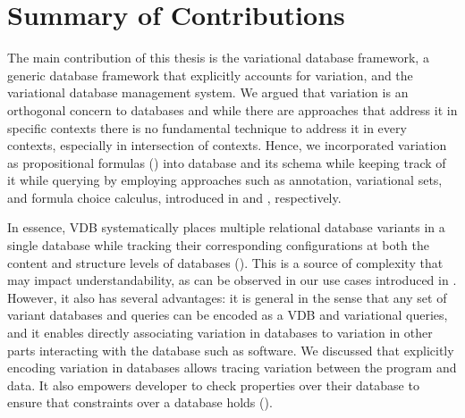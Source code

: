 \section{Summary of Contributions}
\label{sec:sum-contr}

The main contribution of this thesis is the variational database framework, 
a generic database framework that explicitly accounts for variation, 
and the variational database management system. 
%
We argued that variation is an orthogonal concern to databases
and while there are approaches that address it in specific contexts
there is no fundamental technique to address it in every contexts, especially in 
intersection of contexts. Hence, we incorporated variation as 
propositional formulas () 
into database and its schema while keeping
track of it while querying by employing approaches such as annotation,
variational sets, and formula choice calculus, introduced in  and
, respectively.
%


In essence, VDB systematically places multiple relational database variants 
in a single database while tracking their corresponding configurations at both
the content and structure levels of databases (). 
%
This is a source of complexity that may impact understandability, as can be
observed in our use cases introduced in . 
However, it also has several advantages: it
is general in the sense that any set of variant databases and queries can be
encoded as a VDB and variational queries, and it enables directly associating variation
in databases to variation in other parts interacting with the database such as software.
%
 We discussed that explicitly encoding variation in databases
 allows  tracing variation between the program and data. It also empowers
 developer to check properties over their database to ensure that
 constraints over a database holds ().




